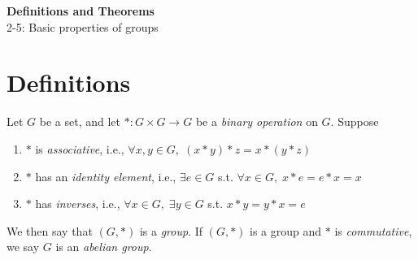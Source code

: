 \noindent
\textbf{\LARGE Definitions and Theorems} \\
\large 2-5: Basic properties of groups

\normalsize

\section*{Definitions}

 Let $G$ be a set, and let $\ast: G \times G \rightarrow G$ be a \textit{binary operation} on $G$. Suppose
\begin{enumerate}
    \item $\ast$ is \textit{associative}, i.e., $\forall x, y \in G, \; (x \ast y) \ast z = x \ast (y \ast z)$
    \item $\ast$ has an \textit{identity element}, i.e., $\exists e \in G$ s.t. $\forall x \in G, \; x \ast e = e \ast x = x$
    \item $\ast$ has \textit{inverses}, i.e., $\forall x \in G, \; \exists y \in G $ s.t. $x \ast y = y \ast x = e$
\end{enumerate}
We then say that $(G, \ast)$ is a \textit{group}.
If $(G, \ast)$ is a group and $\ast$ is \textit{commutative}, we say $G$ is an \textit{abelian group}.